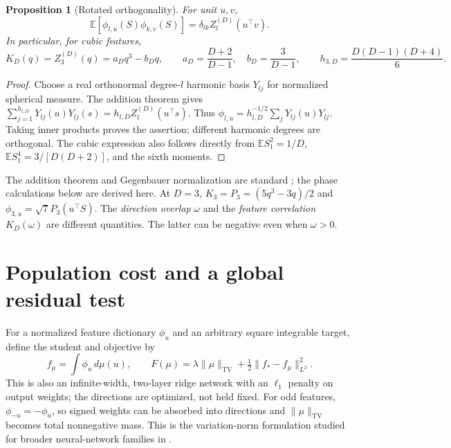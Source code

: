 \documentclass[11pt]{article}
\newcommand{\E}{\mathbb E}
\newcommand{\norm}[1]{\lVert #1\rVert}
\newcommand{\TV}{\mathrm{TV}}
\newtheorem{proposition}[theorem]{Proposition}
\theoremstyle{remark}
\begin{document}
\begin{proposition}[Rotated orthogonality]\label{prop:addition}
For unit $u,v$,
\begin{equation}\label{eq:addition}
 \E[\phi_{l,u}(S)\phi_{k,v}(S)]
   =\delta_{lk}Z_l^{(D)}(u^\top v).
\end{equation}
In particular, for cubic features,
\begin{equation}\label{eq:kernel}
 K_D(q)=Z_3^{(D)}(q)=a_Dq^3-b_Dq,
 \qquad a_D=\frac{D+2}{D-1},\quad b_D=\frac3{D-1},
 \qquad h_{3,D}=\frac{D(D-1)(D+4)}6.
\end{equation}
\end{proposition}
\begin{proof}
Choose a real orthonormal degree-$l$ harmonic basis $Y_{lj}$ for normalized
spherical measure. The addition theorem gives
$\sum_{j=1}^{h_{l,D}}Y_{lj}(u)Y_{lj}(s)=h_{l,D}Z_l^{(D)}(u^\top s)$.
Thus $\phi_{l,u}=h_{l,D}^{-1/2}\sum_jY_{lj}(u)Y_{lj}$.
Taking inner products proves the assertion; different harmonic degrees
are orthogonal. The cubic expression also follows directly from
$\E S_1^2=1/D$, $\E S_1^4=3/[D(D+2)]$, and the sixth moments.
\end{proof}

The addition theorem and Gegenbauer normalization are standard
\cite{dlmf,frye}; the phase calculations below are derived here.
At $D=3$, $K_3=P_3=(5q^3-3q)/2$ and
$\phi_{3,u}=\sqrt7 P_3(u^\top S)$. The \emph{direction overlap} $\omega$
and the \emph{feature correlation} $K_D(\omega)$ are different quantities.
The latter can be negative even when $\omega>0$.

\section{Population cost and a global residual test}

For a normalized feature dictionary $\phi_u$ and an arbitrary square
integrable target, define the student and objective by
\begin{equation}\label{eq:measure}
 f_\mu=\int\phi_u\,d\mu(u),\qquad
 F(\mu)=\lambda\norm{\mu}_{\TV}+\tfrac12\norm{f_*-f_\mu}_{L^2}^2.
\end{equation}
This is also an infinite-width, two-layer ridge network with an $\ell_1$
penalty on output weights; the directions are optimized, not held fixed.
For odd features, $\phi_{-u}=-\phi_u$, so signed weights can be absorbed
into directions and $\norm\mu_\TV$ becomes total nonnegative mass.
This is the variation-norm formulation studied for broader neural-network
families in \cite{bach}.
\end{document}
